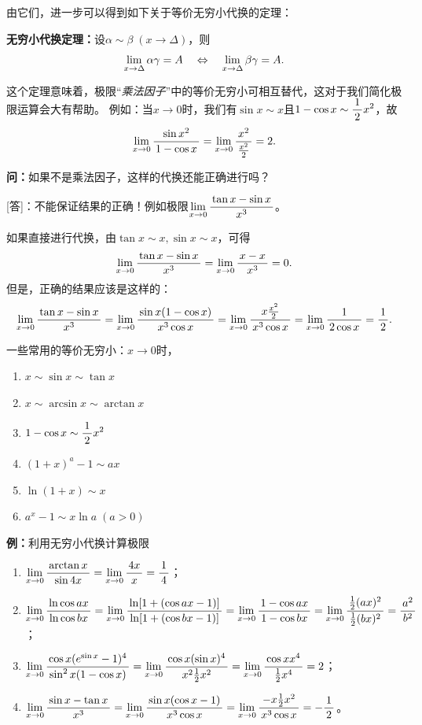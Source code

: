 由它们，进一步可以得到如下关于等价无穷小代换的定理：

\begin{thx}
	{\bf 无穷小代换定理：}设$\alpha\sim \beta\;(x\to\Delta)$，则
	$$\limx{\Delta}\alpha\gamma=A
	\quad\Leftrightarrow\quad\limx{\Delta}\beta\gamma=A.$$
\end{thx}

这个定理意味着，极限“{\it 乘法因子}”中的等价无穷小可相互替代，这对于我们简化极限运算会大有帮助。
例如：当$x\to 0$时，我们有$\sin x\sim x$且$1-\cos x\sim\df12x^2$，故
$$\limx0\df{\sin x^2}{1-\cos x}=\limx0\df{x^2}{\frac{x^2}2}=2.$$

{\bf 问：}如果不是乘法因子，这样的代换还能正确进行吗？

[答]：不能保证结果的正确！例如极限$\limx0\df{\tan x-\sin x}{x^3}$。

如果直接进行代换，由$\tan x\sim x,\sin x\sim x$，可得
$$\limx0\df{\tan x-\sin x}{x^3}=\limx0\df{x-x}{x^3}=0.$$
但是，正确的结果应该是这样的：
$$
	\limx0\df{\tan x-\sin x}{x^3}
	=\limx0\df{\sin x(1-\cos x)}{x^3\cos x}
	=\limx0\df{x\frac{x^2}2}{x^3\cos x}
	=\limx0\df1{2\cos x}=\df12.
$$

\begin{thx}
	一些常用的等价无穷小：$x\to 0$时，
	\begin{enumerate}[(1)]
	  \item $x\sim \sin x\sim \tan x$ 
	  \item $x \sim\arcsin x\sim\arctan x$ 
	  \item $1-\cos x\sim \df 12 x^2$ 
	  \item $(1+x)^a-1\sim ax$ 
	  \item $\ln(1+x)\sim x$ 
	  \item $a^x-1\sim x\ln a\;(a>0)$
	\end{enumerate}
\end{thx}

{\bf 例：}利用无穷小代换计算极限
\begin{enumerate}[(1)]
  \setlength{\itemindent}{1cm}
  \item $\limx{0}\df{\arctan x}{\sin 4x}=\limx0\df{4x}x=\df14$； 
  \item $\limx{0}\df{\ln\cos ax}{\ln\cos bx}
  =\limx{0}\df{\ln[1+(\cos ax-1)]}{\ln[1+(\cos bx-1)]}
  =\limx{0}\df{1-\cos ax}{1-\cos bx}
  =\limx{0}\df{\frac12(ax)^2}{\frac12(bx)^2}
  =\df{a^2}{b^2}$；
  \item $\limx{0}\df{\cos x(e^{\sin x}-1)^4}{\sin^2 x(1-\cos x)}
  =\limx0\df{\cos x(\sin x)^4}{x^2\frac12x^2}
  =\limx0\df{\cos x x^4}{\frac12x^4} =2$； 
  \item $\limx{0}\df{\sin x-\tan x}{x^3}
  =\limx{0}\df{\sin x(\cos x-1)}{x^3\cos  x}
  =\limx{0}\df{-x\frac12x^2}{x^3\cos  x}=-\df12$。
\end{enumerate}

